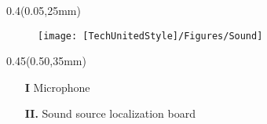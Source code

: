 \documentclass[aspectratio=43]{beamer}
\newcommand{\TULeftMargin}{0.05\paperwidth}
\newcommand{\TULeftWidth}{0.4\paperwidth}
\newcommand{\TURightMargin}{0.50\paperwidth}
\newcommand{\TURightWidth}{0.45\paperwidth}
\begin{document}
	\begin{frame}
	
		\begin{textblock*}{\TULeftWidth}(\TULeftMargin,25mm)
			\begin{figure}
				\centering
				\texttt{[image: [TechUnitedStyle]/Figures/Sound]}
			\end{figure}
		\end{textblock*}
		
	\begin{textblock*}{\TURightWidth}(\TURightMargin,35mm)
		
			\begin{itemize}
				\item[\textcolor{TechUnitedGreen}{\textbf{I}}] Microphone
				
				\item[\textcolor{TechUnitedGreen}{\textbf{II.}}] Sound source localization board
			\end{itemize}
	\end{textblock*}	
	
	\end{frame}

%	
	
	
\end{document}

